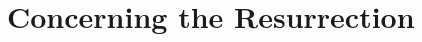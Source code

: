 \documentclass[../main.tex]{subfiles}
\begin{document}
	
	\chapter{Concerning the Resurrection}
	
	
	
	\theendnotes
	\setcounter{endnote}{0}
\end{document}
